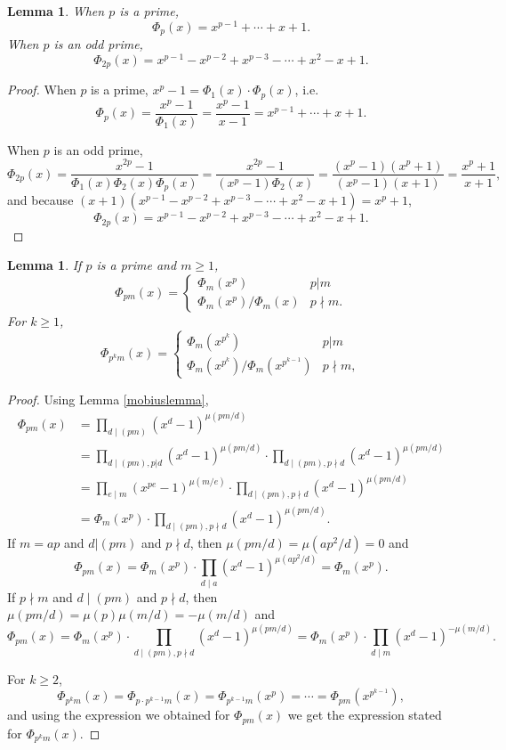 \documentclass{article}
\newtheorem{lemma}[theorem]{Lemma}
\theoremstyle{definition}
\begin{document}
\begin{lemma}
When $p$ is a prime,
\[
\Phi_p(x)  = x^{p-1}+\cdots+x+1.
\]
When $p$ is an odd prime,
\[
\Phi_{2p}(x)  = x^{p-1}-x^{p-2}+x^{p-3}-\cdots+x^2-x+1.
\]
\end{lemma}
\begin{proof}
When $p$ is a prime, $x^p-1 = \Phi_1(x) \cdot \Phi_p(x)$, i.e. 
\[
\Phi_p(x) =\frac{x^p-1}{\Phi_1(x)}= \frac{x^p-1}{x-1} = x^{p-1}+\cdots+x+1.
\]

When $p$ is an odd prime, 
\[
\Phi_{2p}(x) = \frac{x^{2p}-1}{\Phi_1(x) \Phi_2(x) \Phi_p(x)}
 = \frac{x^{2p}-1}{(x^p-1) \Phi_2(x)}
  = 
\frac{(x^p-1)(x^p+1)}{(x^p-1) (x+1)}
=\frac{x^p+1}{x+1},
\]
and because $(x+1)(x^{p-1}-x^{p-2}+x^{p-3}-\cdots+x^2-x+1) = x^p+1$,
\[
\Phi_{2p}(x) = x^{p-1}-x^{p-2}+x^{p-3}-\cdots+x^2-x+1.
\]
\end{proof}




\begin{lemma}
If $p$ is a prime and $m \geq 1$, 
\[
\Phi_{pm}(x)=
\begin{cases}
\Phi_m(x^p)& p | m\\
\Phi_m(x^p)/\Phi_m(x)&p \nmid m.
\end{cases}
\]
For $k \geq 1$,
\[
\Phi_{p^k m}(x)=
\begin{cases}
\Phi_m(x^{p^k})& p | m\\
\Phi_m(x^{p^k})/\Phi_m(x^{p^{k-1}})&p \nmid m,
\end{cases}
\]
\label{pmPhi}
\end{lemma}
\begin{proof}
Using Lemma \ref{mobiuslemma},
\begin{align*}
\Phi_{pm}(x)&= \prod_{d \mid (pm)} (x^d-1)^{\mu(pm/d)}\\
&= \prod_{d \mid (pm), p|d} (x^d-1)^{\mu(pm/d)} \cdot  \prod_{d \mid (pm), p \nmid d} (x^d-1)^{\mu(pm/d)}\\
&= \prod_{e \mid m} (x^{pe}-1)^{\mu(m/e)} \cdot  \prod_{d \mid (pm), p \nmid d} (x^d-1)^{\mu(pm/d)}\\
&=\Phi_m(x^p) \cdot \prod_{d \mid (pm), p \nmid d} (x^d-1)^{\mu(pm/d)}.
\end{align*}
If $m=ap$ and $d|(pm)$ and $p \nmid d$,  then $\mu(pm/d)=\mu(ap^2/d)=0$ and
\[
\Phi_{pm}(x) = \Phi_m(x^p) \cdot \prod_{d \mid a} (x^d-1)^{\mu(ap^2/d)} = \Phi_m(x^p).
\]
If $p \nmid m$ and $d \mid (pm)$ and $p \nmid d$, then $\mu(pm/d) = \mu(p) \mu(m/d)=-\mu(m/d)$ and
\[
\Phi_{pm}(x) = \Phi_m(x^p) \cdot  \prod_{d \mid (pm), p \nmid d} (x^d-1)^{\mu(pm/d)} = 
\Phi_m(x^p) \cdot \prod_{d \mid m} (x^d-1)^{-\mu(m/d)}.
\]

For $k \geq 2$,
\[
\Phi_{p^k m}(x) = \Phi_{p \cdot p^{k-1}m}(x) = \Phi_{p^{k-1}m}(x^p)
=\cdots = \Phi_{pm}(x^{p^{k-1}}),
\]
and using the expression we obtained for $\Phi_{pm}(x)$ we get
the expression stated for $\Phi_{p^km}(x)$. 
\end{proof}
\end{document}
